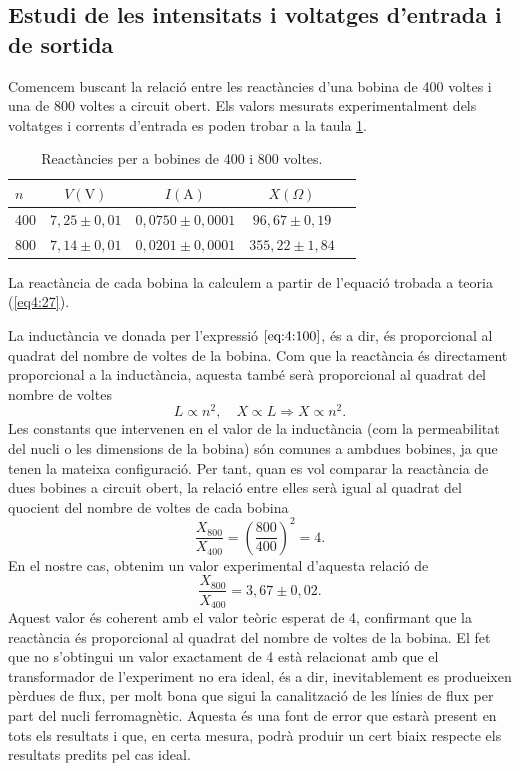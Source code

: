 \documentclass[a4paper,10.5pt]{report}
\begin{document}
\subsection{Estudi de les intensitats i voltatges d'entrada i de sortida}
Comencem buscant la relació entre les reactàncies d'una bobina de 400 voltes i una de 800 voltes a circuit obert. Els valors mesurats experimentalment dels voltatges i corrents d'entrada es poden trobar a la taula \ref{tab:4.3}. 

\begin{table}[H]
	\centering
	\renewcommand{\arraystretch}{1.2}
	\caption{Reactàncies per a bobines de 400 i 800 voltes.}
	\begin{tabular}{lcccc}
		\toprule
		$n$ & $V (\text{V})$ & $I (\text{A})$ & $X(\Omega)$ \\
		\midrule
		400 & $7{,}25 \pm 0{,}01$ & $0{,}0750 \pm 0{,}0001$ & $96{,}67 \pm 0{,}19$ \\
		800 & $7{,}14 \pm 0{,}01$ & $0{,}0201 \pm 0{,}0001$ & $355{,}22 \pm 1{,}84$ \\
		\bottomrule
	\end{tabular}
	\label{tab:4.3}
\end{table}
La reactància de cada bobina la calculem a partir de l'equació trobada a teoria (\ref{eq4:27}).

La inductància ve donada per l'expressió $\ref{eq:4:100}$, és a dir, és proporcional al quadrat del nombre de voltes de la bobina. Com que la reactància és directament proporcional a la inductància, aquesta també serà proporcional al quadrat del nombre de voltes
\begin{equation}
	L \propto n^2, \quad X \propto L  \Rightarrow  X \propto n^2. \label{eq:4.31}
\end{equation}
Les constants que intervenen en el valor de la inductància (com la permeabilitat del nucli o les dimensions de la bobina) són comunes a ambdues bobines, ja que tenen la mateixa configuració. Per tant, quan es vol comparar la reactància de dues bobines a circuit obert, la relació entre elles serà igual al quadrat del quocient del nombre de voltes de cada bobina
\begin{equation*}
	\frac{X_{800}}{X_{400}} = \left( \frac{800}{400} \right)^2 = 4. \label{eq:4.30}
\end{equation*}
En el nostre cas, obtenim un valor experimental d'aquesta relació de 
\begin{equation*}
	\frac{X_{800}}{X_{400}} = 3,67 \pm 0,02.
\end{equation*}
Aquest valor és coherent amb el valor teòric esperat de 4, confirmant que la reactància és proporcional al quadrat del nombre de voltes de la bobina. El fet que no s'obtingui un valor exactament de 4 està relacionat amb que el transformador de l'experiment no era ideal, és a dir, inevitablement es produeixen pèrdues de flux, per molt bona que sigui la canalització de les línies de flux per part del nucli ferromagnètic. Aquesta és una font de error que estarà present en tots els resultats i que, en certa mesura, podrà produir un cert biaix respecte els resultats predits pel cas ideal.
\end{document}
